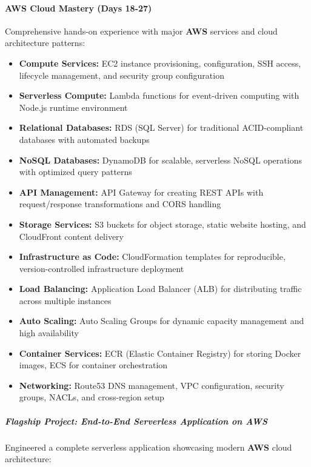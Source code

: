 \paragraph{AWS Cloud Mastery (Days 18-27)}

Comprehensive hands-on experience with major \textbf{AWS} services and cloud architecture patterns:

\begin{itemize}
    \item \textbf{Compute Services:} EC2 instance provisioning, configuration, SSH access, lifecycle management, and security group configuration
    \item \textbf{Serverless Compute:} Lambda functions for event-driven computing with Node.js runtime environment
    \item \textbf{Relational Databases:} RDS (SQL Server) for traditional ACID-compliant databases with automated backups
    \item \textbf{NoSQL Databases:} DynamoDB for scalable, serverless NoSQL operations with optimized query patterns
    \item \textbf{API Management:} API Gateway for creating REST APIs with request/response transformations and CORS handling
    \item \textbf{Storage Services:} S3 buckets for object storage, static website hosting, and CloudFront content delivery
    \item \textbf{Infrastructure as Code:} CloudFormation templates for reproducible, version-controlled infrastructure deployment
    \item \textbf{Load Balancing:} Application Load Balancer (ALB) for distributing traffic across multiple instances
    \item \textbf{Auto Scaling:} Auto Scaling Groups for dynamic capacity management and high availability
    \item \textbf{Container Services:} ECR (Elastic Container Registry) for storing Docker images, ECS for container orchestration
    \item \textbf{Networking:} Route53 DNS management, VPC configuration, security groups, NACLs, and cross-region setup
\end{itemize}

\subparagraph{Flagship Project: End-to-End Serverless Application on AWS}

Engineered a complete serverless application showcasing modern \textbf{AWS} cloud architecture:

